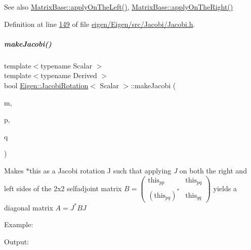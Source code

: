 \begin{DoxySeeAlso}{See also}
\hyperlink{group___core___module_a3a08ad41e81d8ad4a37b5d5c7490e765}{Matrix\+Base\+::apply\+On\+The\+Left()}, \hyperlink{group___core___module_a45d91752925d2757fc8058a293b15462}{Matrix\+Base\+::apply\+On\+The\+Right()} 
\end{DoxySeeAlso}


Definition at line \hyperlink{eigen_2_eigen_2src_2_jacobi_2_jacobi_8h_source_l00149}{149} of file \hyperlink{eigen_2_eigen_2src_2_jacobi_2_jacobi_8h_source}{eigen/\+Eigen/src/\+Jacobi/\+Jacobi.\+h}.

\mbox{\label{group___jacobi___module_a69076401f22e883dc76b6ff9074ac669}} 
\subparagraph{\texorpdfstring{make\+Jacobi()}{makeJacobi()}\hspace{0.1cm}{\footnotesize\ttfamily [1/2]}}
{\footnotesize\ttfamily template$<$typename Scalar $>$ \\
template$<$typename Derived $>$ \\
bool \hyperlink{group___jacobi___module_class_eigen_1_1_jacobi_rotation}{Eigen\+::\+Jacobi\+Rotation}$<$ Scalar $>$\+::make\+Jacobi (\begin{DoxyParamCaption}\item[{const \hyperlink{group___core___module_class_eigen_1_1_matrix_base}{Matrix\+Base}$<$ Derived $>$ \&}]{m,  }\item[{\hyperlink{namespace_eigen_a62e77e0933482dafde8fe197d9a2cfde}{Index}}]{p,  }\item[{\hyperlink{namespace_eigen_a62e77e0933482dafde8fe197d9a2cfde}{Index}}]{q }\end{DoxyParamCaption})\hspace{0.3cm}{\ttfamily [inline]}}

Makes {\ttfamily $\ast$this} as a Jacobi rotation {\ttfamily J} such that applying {\itshape J} on both the right and left sides of the 2x2 selfadjoint matrix $ B = \left ( \begin{array}{cc} \text{this}_{pp} & \text{this}_{pq} \\ (\text{this}_{pq})^* & \text{this}_{qq} \end{array} \right )$ yields a diagonal matrix $ A = J^* B J $

Example\+: 
\begin{DoxyCodeInclude}
\end{DoxyCodeInclude}
 Output\+: 
\begin{DoxyVerbInclude}
\end{DoxyVerbInclude}


